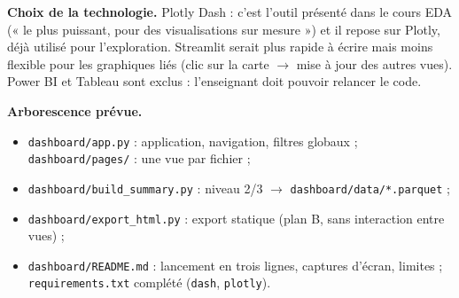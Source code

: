 \documentclass[10.5pt, a4paper]{article}
\begin{document}
\begin{center}
\end{center}

\textbf{Choix de la technologie.} Plotly Dash : c'est l'outil présenté dans le cours EDA (« le plus puissant, pour des
visualisations sur mesure ») et il repose sur Plotly, déjà utilisé pour l'exploration. Streamlit serait plus rapide à écrire mais moins flexible pour les graphiques liés (clic sur la
carte $\to$ mise à jour des autres vues). Power BI et Tableau sont exclus : l'enseignant doit pouvoir relancer le code.

\textbf{Arborescence prévue.}
\begin{itemize}
\item \texttt{dashboard/app.py} : application, navigation, filtres globaux ; \texttt{dashboard/pages/} : une vue par fichier ;
\item \texttt{dashboard/build\_summary.py} : niveau 2/3 $\to$ \texttt{dashboard/data/*.parquet} ;
\item \texttt{dashboard/export\_html.py} : export statique (plan B, sans interaction entre vues) ;
\item \texttt{dashboard/README.md} : lancement en trois lignes, captures d'écran, limites ; \texttt{requirements.txt} complété (\texttt{dash}, \texttt{plotly}).
\end{itemize}
\end{document}
